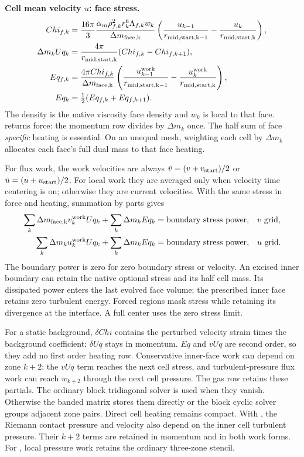 \documentclass[11pt]{article}
\newcommand{\code}[1]{\texttt{\detokenize{#1}}}
\numberwithin{equation}{section}
\begin{document}
\textbf{Cell mean velocity $u$: face stress.}
\begin{align}
 Chi_{f,k}&=\frac{16\pi}{3}
 \frac{\alpha_m\rho_{f,k}^2r_k^6\Lambda_{f,k}w_k}
      {\Delta m_{\rm face,k}}
 \left(\frac{u_{k-1}}{r_{\rm mid,start,k-1}}
                  -\frac{u_k}{r_{\rm mid,start,k}}\right),\\
 \Delta m_kUq_k&=\frac{4\pi}{r_{\rm mid,start,k}}
                         (Chi_{f,k}-Chi_{f,k+1}),\\
 Eq_{f,k}&=\frac{4\pi Chi_{f,k}}{\Delta m_{\rm face,k}}
 \left(\frac{u_{k-1}^{\rm work}}{r_{\rm mid,start,k-1}}
                  -\frac{u_k^{\rm work}}{r_{\rm mid,start,k}}\right),\\
 Eq_k&=\tfrac12(Eq_{f,k}+Eq_{f,k+1}).
\end{align}
The density is the native viscosity face density and $w_k$ is local to that
face. \code{compute_Uq_dm_cell} returns force:
the momentum row divides by $\Delta m_k$ once.
The half sum of face \emph{specific} heating is essential. On an unequal
mesh, weighting each cell by $\Delta m_k$ allocates each face's full dual
mass to that face heating.

For flux work, the work velocities are always
$\bar v=(v+v_{\rm start})/2$ or $\bar u=(u+u_{\rm start})/2$.
For local work they are averaged only when velocity time centering is on;
otherwise they are current velocities.
With the same stress in force and heating, summation by parts gives
\begin{align}
 \sum_k\Delta m_{\rm face,k}v_k^{\rm work}Uq_k
       +\sum_k\Delta m_kEq_k&=\text{boundary stress power},
                    &&v\text{ grid},\\
 \sum_k\Delta m_ku_k^{\rm work}Uq_k
       +\sum_k\Delta m_kEq_k&=\text{boundary stress power},
                    &&u\text{ grid}.
\end{align}
The boundary power is zero for zero boundary stress or velocity.
An excised inner boundary can retain the native optional stress and its
half cell mass. Its dissipated power enters the last evolved face volume;
the prescribed inner face retains zero turbulent energy. Forced regions
mask stress while retaining its divergence
at the interface. A full center uses the zero stress limit.

For a static background, $\delta Chi$ contains the perturbed velocity
strain times the background coefficient; $\delta Uq$ stays in momentum.
$Eq$ and $vUq$ are second order, so they add no first order heating row.
Conservative inner-face work can depend on zone $k+2$: the $vUq$ term
reaches the next cell stress, and turbulent-pressure flux work can reach
$w_{k+2}$ through the next cell pressure. The gas row retains these partials.
The ordinary block tridiagonal solver is used when they vanish. Otherwise
the banded matrix stores them directly or the block cyclic solver groups
adjacent zone pairs. Direct cell heating remains compact. With \code{u_flag}, the Riemann
contact pressure and velocity also depend on the inner cell turbulent
pressure. Their $k+2$ terms are retained in momentum and in both work forms.
For \code{v_flag}, local pressure work retains the ordinary three-zone stencil.
\end{document}
